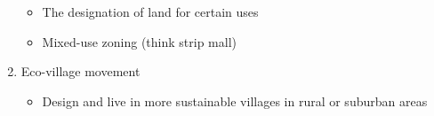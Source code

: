 \documentclass[12pt]{article}
\begin{document}
\begin{enumerate}
    \begin{itemize}

      \item The designation of land for certain uses

      \item Mixed-use zoning (think strip mall)

    \end{itemize}

  \item Eco-village movement

    \begin{itemize}

      \item Design and live in more sustainable villages in rural or suburban areas

    \end{itemize}

\end{enumerate}
\end{document}
